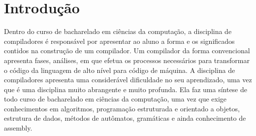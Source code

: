\documentclass[12pt,oneside,a4paper,chapter=TITLE,section=TITLE,sumario=tradicional]{abntex2}
\begin{document}
\listadegraficos
\listadequadros

\sumario

\textual

\chapter{Introdução}
\label{cap:introducao}


Dentro do curso de bacharelado em ciências da computação, a disciplina de compiladores é responsável por apresentar ao aluno a forma e os significados contidos na construção de um compilador. Um compilador da forma convencional apresenta fases, análises, em que efetua os processos necessários para transformar o código da linguagem de alto nível para código de máquina. A disciplina de compiladores apresenta uma considerável dificuldade no seu aprendizado, uma vez que é uma disciplina muito abrangente e muito profunda. Ela faz uma síntese de todo curso de bacharelado em ciências da computação, uma vez que exige conhecimentos em algoritmos, programação estruturada e orientado a objetos, estrutura de dados, métodos de autômatos, gramáticas e ainda conhecimento de assembly. 
\end{document}
